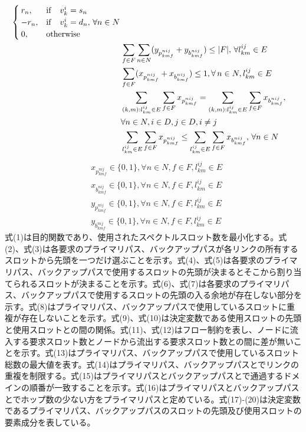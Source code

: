 \documentclass[a4j,twocolumn,fleqn]{jarticle}
\begin{document}
\begin{eqnarray}
\begin{cases}
	r_n,&{\rm if}\quad v^i_k = s_n\\
	-r_n,&{\rm if}\quad v^i_k = d_n,\, \forall n\in N\\ %
	0,&{\rm otherwise}
	\end{cases}\\
	&\displaystyle \sum_{f \in F}\sum_{n \in N}(y_{p^{nij}_{kmf}} + y_{b^{nij}_{kmf}}) \leq |F|,\, \forall l^{ij}_{km} \in E \\%
	&\displaystyle \sum_{f \in F}(x_{p^{nij}_{kmf}}+x_{b^{nij}_{kmf}}) \leq 1,\forall\, n \in N,l^{ij}_{km} \in E\\%
	&\displaystyle \sum_{(k,m):l^{ij}_{km} \in E}\sum_{f \in F}x_{p^{nij}_{kmf}} =\sum_{(k,m):l^{ij}_{km} \in E}\sum_{f \in F}x_{b^{nij}_{kmf}},\nonumber\\
	&\displaystyle \forall n \in N,i \in D,j \in D,i \neq j\\%
	&\displaystyle \sum_{l^{ij}_{km} \in E}\sum_{f \in F}x_{p^{nij}_{kmf}} \leq \sum_{l^{ij}_{km} \in E}\sum_{f \in F}x_{b^{nij}_{kmf}},\, \forall n\in N%
\end{eqnarray}
\begin{eqnarray}
	&\displaystyle x_{p^{nij}_{kmf}} \in \{0,1\},\forall n \in N,f \in F,l^{ij}_{km}\in E\\
	&\displaystyle x_{b^{nij}_{kmf}} \in \{0,1\},\forall n \in N,f \in F,l^{ij}_{km}\in E\\
	&\displaystyle y_{p^{nij}_{kmf}} \in \{0,1\},\forall n \in N,f \in F,l^{ij}_{km}\in E\\
	&\displaystyle y_{b^{nij}_{kmf}} \in \{0,1\},\forall n \in N,f \in F,l^{ij}_{km}\in E
\end{eqnarray}
式(1)は目的関数であり、使用されたスペクトルスロット数を最小化する。式(2)、式(3)は各要求のプライマリパス、バックアップパスが各リンクの所有するスロットから先頭を一つだけ選ぶことを示す。式(4)、式(5)は各要求のプライマリパス、バックアップパスで使用するスロットの先頭が決まるとそこから割り当てられるスロットが決まることを示す。式(6)、式(7)は各要求のプライマリパス、バックアップパスで使用するスロットの先頭の入る余地が存在しない部分を示す。式(8)はプライマリパス、バックアップパスで使用しているスロットに重複が存在しないことを示す。式(9)、式(10)は決定変数である使用スロットの先頭と使用スロットとの間の関係。式(11)、式(12)はフロー制約を表し、ノードに流入する要求スロット数とノードから流出する要求スロット数との間に差が無いことを示す。式(13)はプライマリパス、バックアップパスで使用しているスロット総数の最大値を表す。式(14)はプライマリパス、バックアップパスとでリンクの重複を制限する。式(15)はプライマリパスとバックアップパスとで通過するドメインの順番が一致することを示す。式(16)はプライマリパスとバックアップパスとでホップ数の少ない方をプライマリパスと定めている。式(17)-(20)は決定変数であるプライマリパス、バックアップパスのスロットの先頭及び使用スロットの要素成分を表している。
\end{document}
